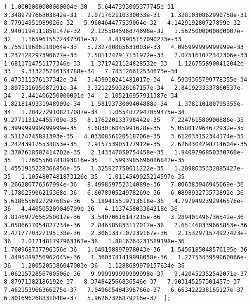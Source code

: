 \documentclass[11pt]{article}
\begin{document}
\begin{Verbatim}[commandchars=\\\{\}]
[ 1.0000000000000004e-30   5.6447393005377745e-31   3.348979766803842e-31   2.071762110330033e-31   1.3281030862990758e-31   8.77914951989026e-32   5.960464477539064e-32   4.142919280727899e-32   2.9401194111858147e-32   2.125584596874698e-32   1.5625000000000007e-32   1.1659615572447301e-32   8.819905157090273e-33   6.755118686118064e-33   5.232780885631003e-33   4.095999999999999e-33   3.237128297390677e-33   2.5811747917131972e-33   2.075161072342306e-33   1.6811714751177346e-33   1.3717421124828532e-33   1.1267558900412042e-33   9.313225746154788e-34   7.743126612534673e-34   6.473311376137342e-34   5.439910241481017e-34   4.5939365799778355e-34   3.897531695087291e-34   3.3212259326167157e-34   2.8419233337860537e-34   2.441406250000001e-34   2.105216957911387e-34   1.8218149331948909e-34   1.5819373009404888e-34   1.378110180795355e-34   1.2042729108217087e-34   1.0554872947059475e-34   9.277113124455709e-35   8.176220133798442e-35   7.224761580900886e-35   6.399999999999999e-35   5.683016845991628e-35   5.058012964672932e-35   4.51174745881393e-35   4.0330856120518706e-35   3.612633152344174e-35   3.242439175534853e-35   2.915753905177912e-35   2.6268304298714604e-35   2.3707618507414702e-35   2.143347050754458e-35   1.9409796850330766e-35   1.7605560781893816e-35   1.5993985696086842e-35   1.4551915228366856e-35   1.325927750611222e-35   1.2098635332085427e-35   1.1054807481873126e-35   1.0114549025214597e-35   9.266280776567994e-36   8.499859752314089e-36   7.806383946945069e-36   7.178025906215368e-36   6.607890524978269e-36   6.089893273573892e-36   5.6186556927297685e-36   5.189415519713618e-36   4.7979492392946576e-36   4.440505209040709e-36   4.113745803364218e-36   3.8146972656250017e-36   3.54070616147215e-36   3.289401496736542e-36   3.0586617054827734e-36   2.846585833117017e-36   2.651468339665853e-36   2.4717770327195138e-36   2.3061337107239167e-36   2.1532971574927423e-36   2.0121481797963167e-36   1.8816764231589198e-36   1.760968737796356e-36   1.649198897978043e-36   1.5456185048576195e-36   1.4495489256962045e-36   1.3603741419998058e-36   1.2775343959060066e-36   1.2005205386047003e-36   1.1288689970157634e-36   1.0621572856700506e-36   9.999999999999998e-37   9.420452352542071e-37   8.87971382186192e-37   8.374842566836546e-37   7.903145257301457e-37   7.462153966366275e-37   7.049605404396766e-37   6.663422238165127e-37   6.301696268831048e-37   5.96267326879216e-37  ];

\end{Verbatim}
\end{document}
